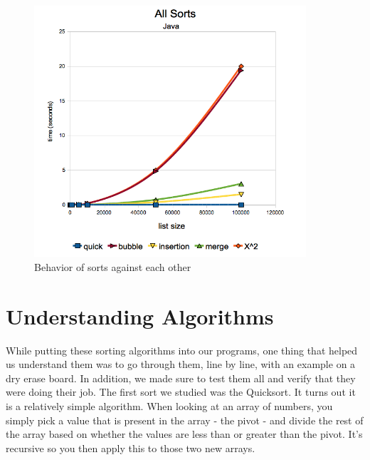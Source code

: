 \documentclass[12pt]{amsart}
\begin{document}
\begin{figure}[h]
  \centering
    \includegraphics[width=0.9\textwidth]{JAllSorts.png}
  \caption{Behavior of sorts against each other}
\end{figure}


\section*{Understanding Algorithms}

While putting these sorting algorithms into our programs, one thing that helped
us understand them was to go through them, line by line, with an example on a
dry erase board. In addition, we made sure to test them all and verify that they
were doing their job. The first sort we studied was the Quicksort. It turns out
it is a relatively simple algorithm. When looking at an array of numbers, you
simply pick a value that is present in the array - the pivot - and divide the 
rest of the array based on whether the values are less than or greater than the 
pivot. It's recursive so you then apply this to those two new arrays.
\end{document}
